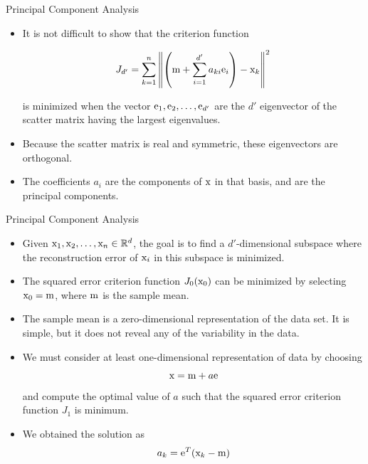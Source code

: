 \begin{frame}{Principal Component Analysis}
\begin{itemize}
\setlength{\itemsep}{12pt}
\item It is not difficult to show that the criterion function
\begin{footnotesize}
\begin{equation}
{J_{d'}} = \sum\limits_{k = 1}^n {{{\left\| {\left( {{\rm m} + \sum\limits_{i = 1}^{d'} {{a_{ki}}{{\rm e}_i}} } \right) - {{\rm x}_k}} \right\|}^2}} \nonumber
\end{equation}
\end{footnotesize}
is minimized when the vector ${\rm e}_1,{\rm e}_2,\ldots,{\rm e}_{d'}$ are the $d'$ eigenvector of the scatter matrix having the largest eigenvalues.
\item Because the scatter matrix is real and symmetric, these eigenvectors are orthogonal.
\item The coefficients $a_i$ are the components of ${\rm x}$ in that basis, and are the principal components.
\end{itemize}
\end{frame}

\begin{frame}{Principal Component Analysis}
\begin{itemize}
\item Given ${\rm x}_1,{\rm x}_2,\ldots,{\rm x}_n\in \mathbb{R}^d$, the goal is to find a $d'$-dimensional
subspace where the reconstruction error of ${\rm x}_i$ in this
subspace is minimized.
\item The squared error criterion function $J_0({\rm x}_0)$ can be minimized by selecting ${\rm x}_0={\rm m}$, where ${\rm m}$ is the sample mean.
\item The sample mean is a zero-dimensional representation of the data set. It is simple, but it does not reveal any of the variability in the data.
\item We must consider at least one-dimensional representation of data by choosing
\[{\rm x}={\rm m}+a{\rm e}\]
and compute the optimal value of $a$ such that the squared error criterion function $J_1$ is minimum.
\item We obtained the solution as
\begin{equation}
a_k={\rm e}^T({\rm x}_k-{\rm m}) \nonumber
\end{equation}
\end{itemize}
\end{frame}

